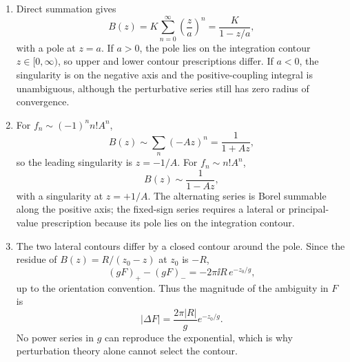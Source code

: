 \begin{enumerate}
  \begin{enumerate}
    \item[(a)]
    Direct summation gives
    \[
      B(z)=K\sum_{n=0}^\infty\left(\frac za\right)^n
        =\boxed{\frac{K}{1-z/a}},
    \]
    with a pole at \(z=a\).  If \(a>0\), the pole lies on the integration
    contour \(z\in[0,\infty)\), so upper and lower contour prescriptions
    differ.  If \(a<0\), the singularity is on the negative axis and the
    positive-coupling integral is unambiguous, although the perturbative
    series still has zero radius of convergence.
    \item[(b)]
    For \(f_n\sim(-1)^nn!A^n\),
    \[
      B(z)\sim\sum_n(-Az)^n=\frac1{1+Az},
    \]
    so the leading singularity is \(z=-1/A\).  For
    \(f_n\sim n!A^n\),
    \[
      B(z)\sim\frac1{1-Az},
    \]
    with a singularity at \(z=+1/A\).  The alternating series is Borel
    summable along the positive axis; the fixed-sign series requires a
    lateral or principal-value prescription because its pole lies on the
    integration contour.
    \item[(c)]
    The two lateral contours differ by a closed contour around the pole.
    Since the residue of \(B(z)=R/(z_0-z)\) at \(z_0\) is \(-R\),
    \[
      (gF)_+-(gF)_-
        =-2\pi \ii R\,e^{-z_0/g},
    \]
    up to the orientation convention.  Thus the magnitude of the
    ambiguity in \(F\) is
    \[
      \boxed{\left|\Delta F\right|
        =\frac{2\pi|R|}{g}e^{-z_0/g}.}
    \]
    No power series in \(g\) can reproduce the exponential, which is why
    perturbation theory alone cannot select the contour.
  \end{enumerate}


\end{enumerate}
